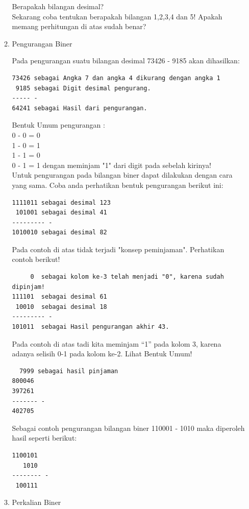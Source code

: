 \begin{enumerate}[label=(\alph*)]
\begin{enumerate}
Berapakah bilangan desimal? \\

Sekarang coba tentukan berapakah bilangan 1,2,3,4 dan 5! Apakah memang perhitungan di atas sudah benar? \\

\item Pengurangan Biner

\qquad Pada pengurangan suatu bilangan desimal 73426 - 9185 akan dihasilkan:
\begin{verbatim}
73426 sebagai Angka 7 dan angka 4 dikurang dengan angka 1
 9185 sebagai Digit desimal pengurang.
----- -
64241 sebagai Hasil dari pengurangan.
\end{verbatim}

Bentuk Umum pengurangan : \\
0 - 0 = 0 \\
1 - 0 = 1 \\
1 - 1 = 0 \\
0 - 1 = 1  dengan meminjam "1" dari digit pada sebelah kirinya! \\

\quad Untuk pengurangan pada bilangan biner dapat dilakukan dengan cara yang sama. Coba anda perhatikan bentuk pengurangan berikut ini:
\begin{verbatim}
1111011 sebagai desimal 123
 101001 sebagai desimal 41
--------- -
1010010 sebagai desimal 82
\end{verbatim}
\qquad Pada contoh di atas tidak terjadi "konsep peminjaman". Perhatikan contoh berikut!

\begin{verbatim}
     0  sebagai kolom ke-3 telah menjadi "0", karena sudah dipinjam!
111101  sebagai desimal 61
 10010  sebagai desimal 18
--------- -
101011  sebagai Hasil pengurangan akhir 43.
\end{verbatim}

\qquad Pada contoh di atas tadi kita meminjam “1” pada kolom 3, karena adanya selisih 0-1 pada kolom ke-2. Lihat Bentuk Umum!
\begin{verbatim}
  7999 sebagai hasil pinjaman
800046
397261
------- -
402705
\end{verbatim}

\qquad Sebagai contoh pengurangan bilangan biner 110001 - 1010 maka diperoleh hasil seperti berikut:
\begin{verbatim}
1100101
   1010
-------- -
 100111
\end{verbatim}

\item Perkalian Biner


\end{enumerate}
\end{enumerate}
